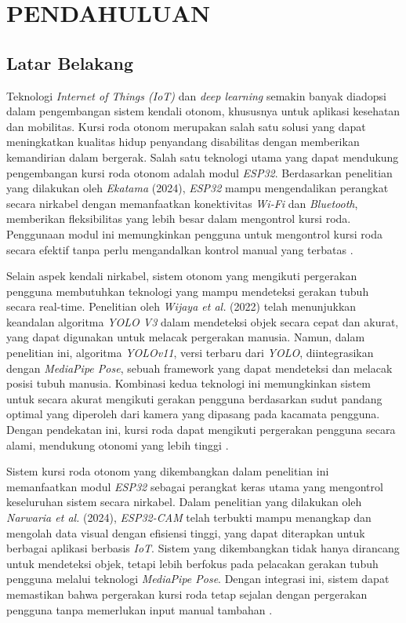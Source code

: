 \chapter{PENDAHULUAN}
\label{chap:pendahuluan}


\section{Latar Belakang}
\label{sec:latarbelakang}

Teknologi \emph{Internet of Things (IoT)} dan \emph{deep learning} semakin banyak diadopsi dalam pengembangan sistem kendali otonom, khususnya untuk aplikasi kesehatan dan mobilitas. Kursi roda otonom merupakan salah satu solusi yang dapat meningkatkan kualitas hidup penyandang disabilitas dengan memberikan kemandirian dalam bergerak. Salah satu teknologi utama yang dapat mendukung pengembangan kursi roda otonom adalah modul \emph{ESP32}. Berdasarkan penelitian yang dilakukan oleh \emph{Ekatama} (2024), \emph{ESP32} mampu mengendalikan perangkat secara nirkabel dengan memanfaatkan konektivitas \emph{Wi-Fi} dan \emph{Bluetooth}, memberikan fleksibilitas yang lebih besar dalam mengontrol kursi roda. Penggunaan modul ini memungkinkan pengguna untuk mengontrol kursi roda secara efektif tanpa perlu mengandalkan kontrol manual yang terbatas \cite{ekatama2024perancangan}.

Selain aspek kendali nirkabel, sistem otonom yang mengikuti pergerakan pengguna membutuhkan teknologi yang mampu mendeteksi gerakan tubuh secara real-time. Penelitian oleh \emph{Wijaya et al.} (2022) telah menunjukkan keandalan algoritma \emph{YOLO V3} dalam mendeteksi objek secara cepat dan akurat, yang dapat digunakan untuk melacak pergerakan manusia. Namun, dalam penelitian ini, algoritma \emph{YOLOv11}, versi terbaru dari \emph{YOLO}, diintegrasikan dengan \emph{MediaPipe Pose}, sebuah framework yang dapat mendeteksi dan melacak posisi tubuh manusia. Kombinasi kedua teknologi ini memungkinkan sistem untuk secara akurat mengikuti gerakan pengguna berdasarkan sudut pandang optimal yang diperoleh dari kamera yang dipasang pada kacamata pengguna. Dengan pendekatan ini, kursi roda dapat mengikuti pergerakan pengguna secara alami, mendukung otonomi yang lebih tinggi \cite{wijaya2022deteksi}.

Sistem kursi roda otonom yang dikembangkan dalam penelitian ini memanfaatkan modul \emph{ESP32} sebagai perangkat keras utama yang mengontrol keseluruhan sistem secara nirkabel. Dalam penelitian yang dilakukan oleh \emph{Narwaria et al.} (2024), \emph{ESP32-CAM} telah terbukti mampu menangkap dan mengolah data visual dengan efisiensi tinggi, yang dapat diterapkan untuk berbagai aplikasi berbasis \emph{IoT}. Sistem yang dikembangkan tidak hanya dirancang untuk mendeteksi objek, tetapi lebih berfokus pada pelacakan gerakan tubuh pengguna melalui teknologi \emph{MediaPipe Pose}. Dengan integrasi ini, sistem dapat memastikan bahwa pergerakan kursi roda tetap sejalan dengan pergerakan pengguna tanpa memerlukan input manual tambahan \cite{10696374}.

